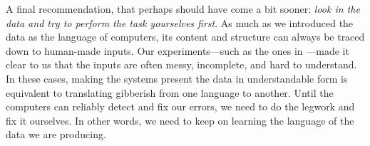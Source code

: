 A final recommendation, that perhaps should have come a bit sooner: \emph{look in the data and try to perform the task yourselves first}. As much as we introduced the data as the language of computers, its content and structure can always be traced down to human-made inputs. Our experiments---such as the ones in ---made it clear to us that the inputs are often messy, incomplete, and hard to understand. In these cases, making the systems present the data in understandable form is equivalent to translating gibberish from one language to another. Until the computers can reliably detect and fix our errors, we need to do the legwork and fix it ourselves. In other words, we need to keep on learning the language of the data we are producing.
